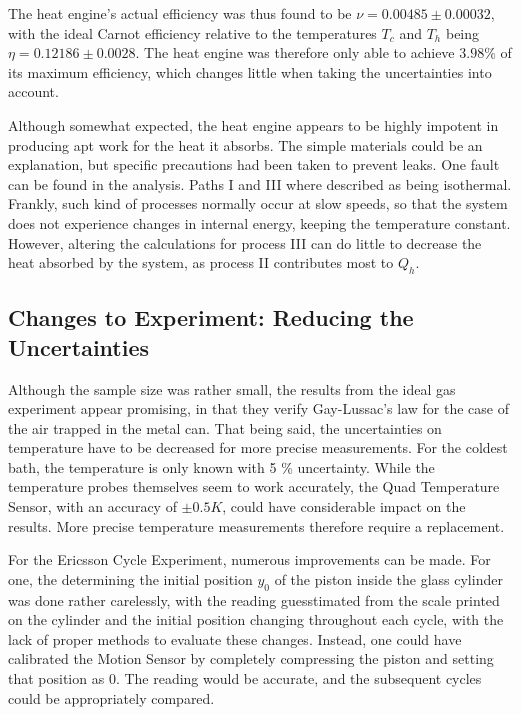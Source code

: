 The heat engine's actual efficiency was thus found to be $\mathit{\nu = 0.00485 \pm 0.00032}$, with the ideal Carnot efficiency relative to the temperatures $\mathit{T_c}$ and $\mathit{T_h}$ being $\mathit{\eta 
= 0.12186 \pm 0.0028}$. The heat engine was therefore only able to achieve $\mathit{3.98 \%}$ of its maximum efficiency, which changes little when taking the uncertainties into account. 

Although somewhat expected, the heat engine appears to be highly impotent in producing apt work for the heat it absorbs. The simple materials could be an explanation, but specific precautions had been taken to prevent leaks. One fault can be found in the analysis. Paths I and III where described as being isothermal. Frankly, such kind of processes normally occur at slow speeds, so that the system does not experience changes in internal energy, keeping the temperature constant. However, altering the calculations for process III can do little to decrease the heat absorbed by the system, as process II contributes most to $\mathit{Q_{h}}$. 

\subsection{Changes to Experiment: Reducing the Uncertainties}
\label{Uncertainty Reduction}

Although the sample size was rather small, the results from the ideal gas experiment appear promising, in that they verify Gay-Lussac's law for the case of the air trapped in the metal can. That being said, the uncertainties on temperature have to be decreased for more precise measurements. For the coldest bath, the temperature is only known with 5 \% uncertainty. While the temperature probes themselves seem to work accurately, the Quad Temperature Sensor, with an accuracy of $\mathit{\pm 0.5K}$, could have considerable impact on the results. More precise temperature measurements therefore require a replacement.

For the Ericsson Cycle Experiment, numerous improvements can be made. For one, the determining the initial position $\mathit{y_0}$ of the piston inside the glass cylinder was done rather carelessly, with the reading guesstimated from the scale printed on the cylinder and the initial position changing throughout each cycle, with the lack of proper methods to evaluate these changes. Instead, one could have calibrated the Motion Sensor by completely compressing the piston and setting that position as 0. The reading would be accurate, and the subsequent cycles could be appropriately compared.

